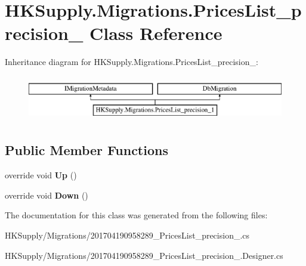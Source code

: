 \hypertarget{class_h_k_supply_1_1_migrations_1_1_prices_list__precision__1}{}\section{H\+K\+Supply.\+Migrations.\+Prices\+List\+\_\+precision\+\_ Class Reference}
\label{class_h_k_supply_1_1_migrations_1_1_prices_list__precision__1}
Inheritance diagram for H\+K\+Supply.\+Migrations.\+Prices\+List\+\_\+precision\+\_\+:\begin{figure}[H]
\begin{center}
\leavevmode
\includegraphics[height=2.000000cm]{class_h_k_supply_1_1_migrations_1_1_prices_list__precision__1}
\end{center}
\end{figure}
\subsection*{Public Member Functions}
\begin{DoxyCompactItemize}
\item 
\mbox{\label{class_h_k_supply_1_1_migrations_1_1_prices_list__precision__1_a5d23adfc2816438cd0c37824378ab357}} 
override void {\bfseries Up} ()
\item 
\mbox{\label{class_h_k_supply_1_1_migrations_1_1_prices_list__precision__1_ab819793e4f1a8c335b136d2534b9e142}} 
override void {\bfseries Down} ()
\end{DoxyCompactItemize}


The documentation for this class was generated from the following files\+:\begin{DoxyCompactItemize}
\item 
H\+K\+Supply/\+Migrations/201704190958289\+\_\+\+Prices\+List\+\_\+precision\+\_.\+cs\item 
H\+K\+Supply/\+Migrations/201704190958289\+\_\+\+Prices\+List\+\_\+precision\+\_.\+Designer.\+cs\end{DoxyCompactItemize}
